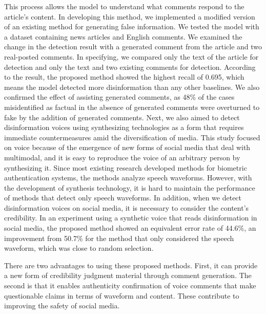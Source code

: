 This process allows the model to understand what comments respond to the article’s content.
In developing this method, we implemented a modified version of an existing method for generating false information.
We tested the model with a dataset containing news articles and English comments.
We examined the change in the detection result with a generated comment from the article and two real-posted comments.
In specifying, we compared only the text of the article for detection and only the text and two existing comments for detection.
According to the result, the proposed method showed the highest recall of 0.695,
which means the model detected more disinformation than any other baselines.
We also confirmed the effect of assisting generated comments, 
as 48\% of the cases misidentified as factual in the absence of generated comments were overturned to fake by the addition of generated comments. 
Next, we also aimed to detect disinformation voices using synthesizing technologies as a form that requires immediate countermeasures amid the diversification of media.
This study focused on voice because of the emergence of new forms of social media that deal with multimodal,
and it is easy to reproduce the voice of an arbitrary person by synthesizing it. Since most existing research developed methods for biometric authentication systems,
the methods analyze speech waveforms.
However, with the development of synthesis technology,
it is hard to maintain the performance of methods that detect only speech waveforms. 
In addition, when we detect disinformation voices on social media,
it is necessary to consider the content’s credibility.
In an experiment using a synthetic voice that reads disinformation in social media,
the proposed method showed an equivalent error rate of 44.6\%,
an improvement from 50.7\% for the method that only considered the speech waveform,
which was close to random selection. 

There are two advantages to using these proposed methods.
First, it can provide a new form of credibility judgment material through comment generation.
The second is that it enables authenticity confirmation of voice comments that make questionable claims in terms of waveform and content.
These contribute to improving the safety of social media. 


